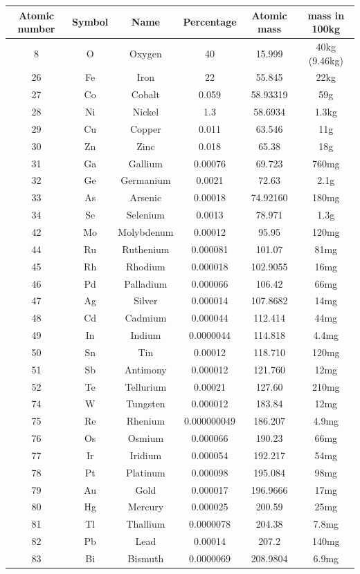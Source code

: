 \documentclass[a4paper]{article}
\begin{document}
    \begin{center}
    	\begin{tabular}{cccccc}
    		Atomic number & Symbol & Name & Percentage & Atomic mass & mass in 100kg \\
    		\hline
    		8 & O & Oxygen & 40 & 15.999 & 40kg (9.46kg) \\
    		26 & Fe & Iron & 22 & 55.845 & 22kg \\
    		27 & Co & Cobalt & 0.059 & 58.93319 & 59g \\
    		28 & Ni & Nickel & 1.3 & 58.6934 & 1.3kg \\
    		29 & Cu & Copper & 0.011 & 63.546 & 11g \\
    		30 & Zn & Zinc & 0.018 & 65.38 & 18g \\
    		31 & Ga & Gallium & 0.00076 & 69.723 & 760mg \\
    		32 & Ge & Germanium & 0.0021 & 72.63 & 2.1g \\
    		33 & As & Arsenic & 0.00018 & 74.92160 & 180mg \\
    		34 & Se & Selenium & 0.0013 & 78.971 & 1.3g \\
    		42 & Mo & Molybdenum & 0.00012 & 95.95 & 120mg \\
    		44 & Ru & Ruthenium & 0.000081 & 101.07 & 81mg \\
    		45 & Rh & Rhodium & 0.000018 & 102.9055 & 16mg \\
    		46 & Pd & Palladium & 0.000066 & 106.42 & 66mg \\
    		47 & Ag & Silver & 0.000014 & 107.8682 & 14mg \\
    		48 & Cd & Cadmium & 0.000044 & 112.414 & 44mg \\
    		49 & In & Indium & 0.0000044 & 114.818 & 4.4mg \\
    		50 & Sn & Tin & 0.00012 & 118.710 & 120mg \\
    		51 & Sb & Antimony & 0.000012 & 121.760 & 12mg \\
    		52 & Te & Tellurium & 0.00021 & 127.60 & 210mg \\
    		74 & W & Tungsten & 0.000012 & 183.84 & 12mg \\
    		75 & Re & Rhenium & 0.000000049 & 186.207 & 4.9mg \\
    		76 & Os & Osmium & 0.000066 & 190.23 & 66mg \\
    		77 & Ir & Iridium & 0.000054 & 192.217 & 54mg \\
    		78 & Pt & Platinum & 0.000098 & 195.084 & 98mg \\
    		79 & Au & Gold & 0.000017 & 196.9666 & 17mg \\
    		80 & Hg & Mercury & 0.000025 & 200.59 & 25mg \\
    		81 & Tl & Thallium & 0.0000078 & 204.38 & 7.8mg \\
    		82 & Pb & Lead & 0.00014 & 207.2 & 140mg \\
    		83 & Bi & Bismuth & 0.0000069 & 208.9804 & 6.9mg \\
    		\hline
    	\end{tabular}
    \end{center}
    
\end{document}

